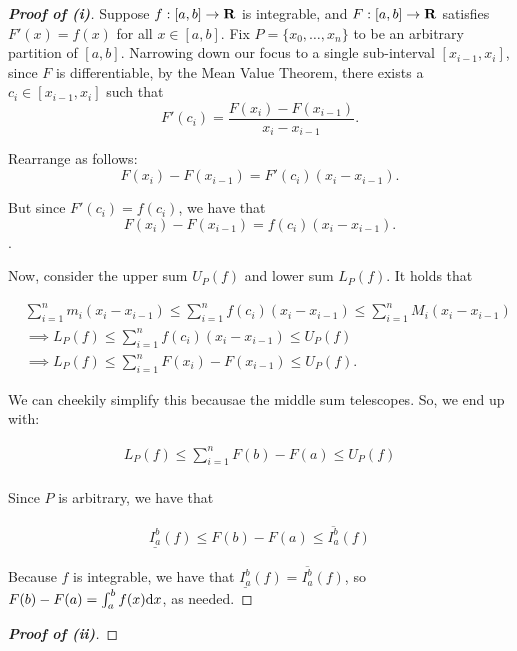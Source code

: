 \documentclass{article}
\begin{document}
  \begin{proof}[\textbf{Proof of (i)}]
    Suppose \(f:[a,b] \to \mathbf{R}\) is integrable, and \(F:[a,b] \to \mathbf{R}\) satisfies \(F'(x) = f(x)\) for all \(x \in [a,b].\) Fix \(P = \{x_0,\ldots, x_n\}\) to be an arbitrary partition of \([a,b]\). Narrowing down our focus to a single sub-interval \([x_{i-1},x_i]\), since \(F\) is differentiable, by the Mean Value Theorem, there exists a \(c_i \in [x_{i-1},x_i]\) such that
    \[
      F'(c_i) = \frac{F(x_i) - F(x_{i-1})}{x_i - x_{i-1}}.
    \] 

    Rearrange as follows:
    \[
      F(x_i) - F(x_{i-1}) = F'(c_i)(x_i - x_{i-1}).
    \]

    But since \(F'(c_i) = f(c_i)\), we have that
    \[
      F(x_i) - F(x_{i-1}) = f(c_i)(x_i - x_{i-1}). 
    \].

    Now, consider the upper sum \(U_P(f)\) and lower sum \(L_P(f)\). It holds that 

    \begin{align*}
      &\sum_{i = 1}^{n}m_i(x_i - x_{i-1}) \leq \sum_{i = 1}^{n}f(c_i)(x_i - x_{i-1}) \leq \sum_{i = 1}^{n}M_i(x_i - x_{i-1}) \\
      &\implies L_P(f) \leq \sum_{i = 1}^{n}f(c_i)(x_i - x_{i-1}) \leq U_P(f) \\
      &\implies L_P(f) \leq \sum_{i = 1}^{n}F(x_i)-F(x_{i-1}) \leq U_P(f).
    \end{align*}

    We can cheekily simplify this becausae the middle sum telescopes. So, we end up with:

    \begin{align*}
      L_P(f) \leq \sum_{i = 1}^{n}F(b)-F(a) \leq U_P(f) \\
    \end{align*}

    Since \(P\) is arbitrary, we have that

    \begin{align*}
      \underline{I_{a}^{b}}(f) \leq F(b) - F(a) \leq \overline{I_{a}^{b}}(f)
    \end{align*}

    Because \(f\) is integrable, we have that \(\underline{I_{a}^{b}}(f) = \overline{I_{a}^{b}}(f)\), so \(F(b) - F(a) = \int_{a}^{b}f(x) \mathrm{d} x\), as needed.
  \end{proof}

  \begin{proof}[\textbf{Proof of (ii)}]
    
  \end{proof}
\end{document}
